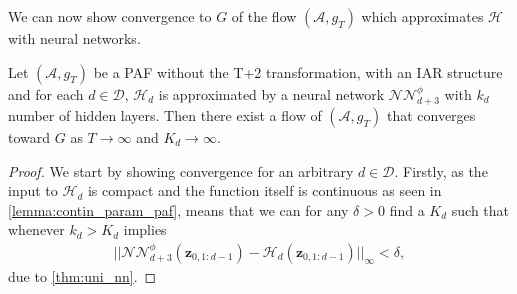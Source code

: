  We can now show convergence to \(G\) of the flow \((\mathcal{A}, g_T)\) which approximates \(\mathcal{H}\) with neural networks. 
\begin{lemma}\label{lemma:paf_multi_dim_NN}
    Let \((\mathcal{A}, g_T)\) be a PAF without the T+2 transformation, with an IAR structure and for each \(d\in\mathcal{D}\), 
    \(\mathcal{H}_d\) is approximated by a neural network \(\mathcal{NN}_{d+3}^{\phi}\) with \(k_d\) number of hidden layers.
    Then there exist a flow of \((\mathcal{A},g_T)\) that converges toward \(G\) as \(T \rightarrow \infty\) and \(K_d \rightarrow \infty\).
\end{lemma}
\begin{proof}
    We start by showing convergence for an arbitrary \(d\in \mathcal{D}\). Firstly, as the input to \(\mathcal{H}_d\) is compact and the function
    itself is continuous as seen in \cref{lemma:contin_param_paf}, means that we can for any \(\delta > 0\) find a \(K_d\) such that whenever
    \(k_d > K_d\) implies
    \begin{align*}
        \lvert\lvert \mathcal{NN}_{d+3}^{\phi}(\bm z_{0,1:d-1}) - \mathcal{H}_d(\bm z_{0,1:d-1})\rvert\rvert_{\infty} < \delta,
    \end{align*}
    due to \cref{thm:uni_nn}.


\end{proof}
